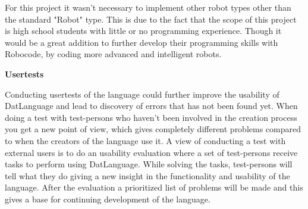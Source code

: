 For this project it wasn't necessary to implement other robot types other than the standard "Robot" type. This is due to the fact that the scope of this project is high school students with little or no programming experience. Though it would be a great addition to further develop their programming skills with Robocode, by coding more advanced and intelligent robots.\newline

\textbf{\LARGE{Usertests}}

Conducting usertests of the language could further improve the usability of DatLanguage and lead to discovery of errors that has not been found yet. When doing a test with test-persons who haven't been involved in the creation process you get a new point of view, which gives completely different problems compared to when the creators of the language use it. 
A view of conducting a test with external users is to do an usability evaluation where a set of test-persons receive tasks to perform using DatLanguage. While solving the tasks, test-persons will tell what they do giving a new insight in the functionality and usability of the language. 
After the evaluation a prioritized list of problems will be made and this gives a base for continuing development of the language. 